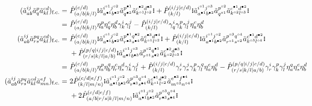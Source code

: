 \documentclass[11pt,fleqn]{article}
\newcommand{\g}{\gamma}      %
\newcommand{\h}{\eta}        %
\newcommand{\tl}{\ensuremath{\tilde}}
\newcommand{\op}[1]{\ensuremath{\hat{#1}}}
\newcommand{\GNO}[1]{\setstackgap{S}{0.7pt}\ensuremath{\Shortstack{\textbf{.} \textbf{.} \textbf{.}}#1\Shortstack{\textbf{.} \textbf{.} \textbf{.}}}}
\theoremstyle{mystyle}
\newcommand{\hole}{\circ}
\newcommand{\ptcl}{\bullet}
\begin{document}
\begin{align*}
  (\tl{a}_{ab}^{ij}\tl{a}_q^p\tl{a}_{kl}^{cd})_{\text{f.c.}}
=&\
  \op{P}^{(c/d)}
        _{(a/b|k/l)}
  \GNO{
    \tl{a}_{a^{\ptcl1}b^{\ptcl3}}
          ^{i^{\hole1}j^{\hole2}}
    \tl{a}_{q^{\ptcl2}}
          ^{p^{\ptcl1}}
    \tl{a}_{k^{\hole1}l^{\hole2}}
          ^{c^{\ptcl2}d^{\ptcl3}}
  }
+
  \op{P}^{(i/j|c/d)}
        _{(k/l)}
  \GNO{
    \tl{a}_{a^{\ptcl1}b^{\ptcl2}}
          ^{i^{\hole1}j^{\hole3}}
    \tl{a}_{q^{\hole1}}
          ^{p^{\hole2}}
    \tl{a}_{k^{\hole2}l^{\hole3}}
          ^{c^{\ptcl1}d^{\ptcl2}}
  }
\\=&\
  \op{P}^{(c/d)}
        _{(a/b|k/l)}
  \h_a^p\h_q^c\h_b^d\g_k^i\g_l^j
-
  \op{P}^{(i/j|c/d)}
        _{(k/l)}
  \g_q^i\g_k^p\g_l^j\h_a^c\h_b^d
\\
  (\tl{a}_{ab}^{ij}\tl{a}_{rs}^{pq}\tl{a}_{kl}^{cd})_{\text{f.c.}}
=&\
  \op{P}^{(c/d)}
        _{(a/b|k/l)}
  \GNO{
    \tl{a}_{a^{\ptcl1}b^{\ptcl2}}
          ^{i^{\hole1}j^{\hole2}}
    \tl{a}_{r^{\ptcl3}s^{\ptcl4}}
          ^{p^{\ptcl1}q^{\ptcl2}}
    \tl{a}_{k^{\hole1}l^{\hole2}}
          ^{c^{\ptcl3}d^{\ptcl4}}
  }
+
  \op{P}^{(i/j|c/d)}
        _{(k/l)}
  \GNO{
    \tl{a}_{a^{\ptcl1}b^{\ptcl2}}
          ^{i^{\hole1}j^{\hole2}}
    \tl{a}_{r^{\hole1}s^{\hole2}}
          ^{p^{\hole3}q^{\hole4}}
    \tl{a}_{k^{\hole3}l^{\hole4}}
          ^{c^{\ptcl1}d^{\ptcl2}}
  }
\\&\
+
  \op{P}^{(p/q|i/j|c/d)}
        _{(r/s|k/l|a/b)}
  \GNO{
    \tl{a}_{a^{\ptcl1}b^{\ptcl3}}
          ^{i^{\hole1}j^{\hole3}}
    \tl{a}_{r^{\hole1}s^{\ptcl2}}
          ^{p^{\hole2}q^{\ptcl1}}
    \tl{a}_{k^{\hole2}l^{\hole3}}
          ^{c^{\ptcl2}d^{\ptcl3}}
  }
\\=&\
  \op{P}^{(c/d)}
        _{(a/b|k/l)}
  \h_a^p\h_b^q\h_r^c\h_s^d
  \g_k^i\g_l^j
+
  \op{P}^{(i/j|c/d)}
        _{(k/l)}
  \g_r^i\g_s^j\g_k^p\g_l^q
  \h_a^c\h_b^d
-
  \op{P}^{(p/q|i/j|c/d)}
        _{(r/s|k/l|a/b)}
  \g_r^i\g_k^p\g_l^j
  \h_a^q\h_s^c\h_b^d
\\
  (\tl{a}_{ab}^{ij}\tl{a}_{rs}^{pq}\tl{a}_{kl}^{cd}\tl{a}_{mn}^{ef})_{\text{f.c.}}
=&\
  2
  \op{P}_{(k/l|m/n)}^{(c/d|e/f)}
  \GNO{
    \tl{a}_{a^{\ptcl1}b^{\ptcl2}}^{i^{\hole1}j^{\hole2}}
    \tl{a}_{r^{\ptcl3}s^{\ptcl4}}^{p^{\hole3}q^{\hole4}}
    \tl{a}_{k^{\hole1}l^{\hole2}}^{c^{\ptcl1}d^{\ptcl2}}
    \tl{a}_{m^{\hole3}n^{\hole4}}^{e^{\ptcl3}f^{\ptcl4}}
  }
\\&\
+
  2
  \op{P}_{(a/b|r/s|k/l|m/n)}^{(c/d|e/f)}
  \GNO{
    \tl{a}_{a^{\ptcl1}b^{\ptcl2}}^{i^{\hole1}j^{\hole2}}
    \tl{a}_{r^{\ptcl3}s^{\ptcl4}}^{p^{\hole3}q^{\hole4}}
}
\end{align*}
\end{document}
